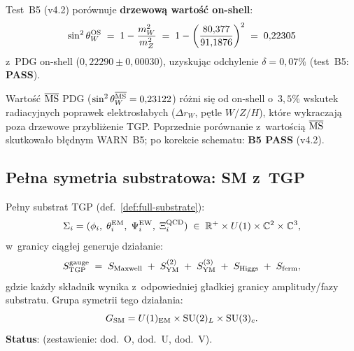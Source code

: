 \begin{remark}%
\label{rem:V-B5-scheme}
Test~B5 (v4.2) por\'ownuje \textbf{drzewow\k{a} warto\'s\'c on-shell}:
\begin{equation}
  \sin^2\theta_W^{\rm OS}
  \;=\; 1 - \frac{m_W^2}{m_Z^2}
  \;=\; 1 - \left(\frac{80{,}377}{91{,}1876}\right)^2
  \;=\; 0{,}22305
\end{equation}
z~PDG on-shell ($0{,}22290 \pm 0{,}00030$), uzyskuj\k{a}c odchylenie
$\delta = 0{,}07\%$ (test~B5: \textbf{PASS}).

Warto\'s\'c $\overline{\rm MS}$ PDG ($\sin^2\theta_W^{\overline{\rm MS}}
= 0{,}23122$) r\'o\.zni si\k{e} od on-shell o~$3{,}5\%$
wskutek radiacyjnych poprawek elektros\l{}abych
($\Delta r_W$, p\k{e}tle $W/Z/H$), kt\'ore wykraczaj\k{a}
poza drzewowe przybli\.zenie TGP.
Poprzednie por\'ownanie z~warto\'sci\k{a} $\overline{\rm MS}$
skutkowa\l{}o b\l{}\k{e}dnym WARN~B5; po korekcie schematu:
\textbf{B5 PASS} (v4.2).
\end{remark}

\subsection{Pełna symetria substratowa: SM z~TGP}%
\label{app:V-SM-unification}

\begin{theorem}\label{thm:V-SM}
Pe\l{}ny substrat TGP (def.~\ref{def:full-substrate}):
\begin{equation}
  \Sigma_i = (\phi_i,\;\theta_i^{\rm EM},\;\Psi_i^{\rm EW},\;\Xi_i^{\rm QCD})
  \;\in\; \mathbb{R}^+ \times U(1) \times \mathbb{C}^2 \times \mathbb{C}^3,
\end{equation}
w~granicy ci\k{a}g\l{}ej generuje dzia\l{}anie:
\begin{equation}\label{eq:V-full-action}
  S_{\rm TGP}^{\rm gauge}
    \;=\; S_{\rm Maxwell}
    \;+\; S_{\rm YM}^{(2)}
    \;+\; S_{\rm YM}^{(3)}
    \;+\; S_{\rm Higgs}
    \;+\; S_{\rm ferm},
\end{equation}
gdzie ka\.zdy sk\l{}adnik wynika z~odpowiedniej g\l{}adkiej granicy
amplitudy/fazy substratu.
Grupa symetrii tego dzia\l{}ania:
\begin{equation}\label{eq:V-GSM}
  G_{\rm SM} = U(1)_{\rm EM} \times \mathrm{SU}(2)_L \times \mathrm{SU}(3)_c.
\end{equation}
\textbf{Status}: 
(zestawienie: dod.~O, dod.~U, dod.~V).
\end{theorem}

